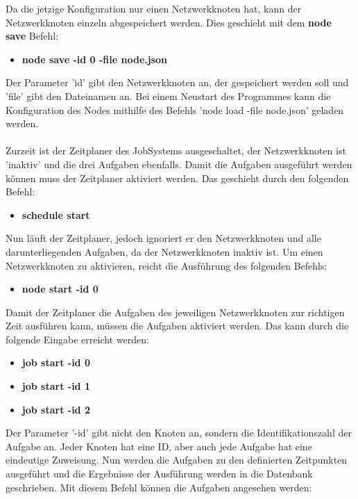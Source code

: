 \documentclass[12pt,a4paper]{report}
\begin{document}
\begin{onehalfspace}
Da die jetzige Konfiguration nur einen Netzwerkknoten hat, kann der Netzwerkknoten einzeln abgespeichert werden. Dies geschieht mit dem \textbf{node save} Befehl:\\

\begin{itemize}
\item \textbf{node save -id 0 -file node.json}
\end{itemize}

Der Parameter 'id' gibt den Netzwerkknoten an, der gespeichert werden soll und 'file' gibt den Dateinamen an. Bei einem Neustart des Programmes kann die Konfiguration des Nodes mithilfe des Befehls 'node load -file node.json' geladen werden.\\\\
Zurzeit ist der Zeitplaner des JobSystems ausgeschaltet, der Netzwerkknoten ist 'inaktiv' und die drei Aufgaben ebenfalls. Damit die Aufgaben ausgeführt werden können muss der Zeitplaner aktiviert werden. Das geschieht durch den folgenden Befehl:\\

\begin{itemize}
\item \textbf{schedule start}
\end{itemize}

Nun läuft der Zeitplaner, jedoch ignoriert er den Netzwerkknoten und alle darunterliegenden Aufgaben, da der Netzwerkknoten inaktiv ist. Um einen Netzwerkknoten zu aktivieren, reicht die Ausführung des folgenden Befehls:\\

\begin{itemize}
\item \textbf{node start -id 0}
\end{itemize}

Damit der Zeitplaner die Aufgaben des jeweiligen Netzwerkknoten zur richtigen Zeit ausführen kann, müssen die Aufgaben aktiviert werden. Das kann durch die folgende Eingabe erreicht werden:\\

\begin{itemize}
\item \textbf{job start -id 0}
\item \textbf{job start -id 1}
\item \textbf{job start -id 2}
\end{itemize}

Der Parameter '-id' gibt nicht den Knoten an, sondern die Identifikationszahl der Aufgabe an. Jeder Knoten hat eine ID, aber auch jede Aufgabe hat eine eindeutige Zuweisung. Nun werden die Aufgaben zu den definierten Zeitpunkten ausgeführt und die Ergebnisse der Ausführung werden in die Datenbank geschrieben. Mit diesem Befehl können die Aufgaben angesehen werden: \\


\end{onehalfspace}
\end{document}
